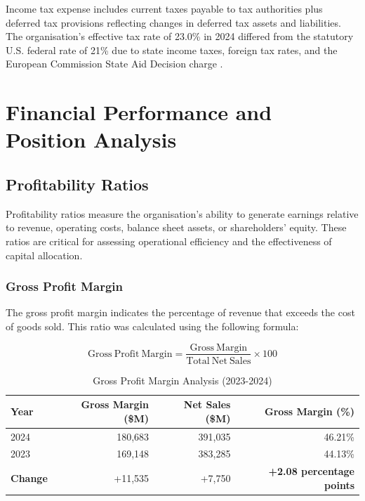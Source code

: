 \documentclass[12pt,a4paper]{article}
\begin{document}
Income tax expense includes current taxes payable to tax authorities plus deferred tax provisions reflecting changes in deferred tax assets and liabilities. The organisation's effective tax rate of 23.0\% in 2024 differed from the statutory U.S. federal rate of 21\% due to state income taxes, foreign tax rates, and the European Commission State Aid Decision charge \citep{apple202410k}.

\section{Financial Performance and Position Analysis}

\subsection{Profitability Ratios}

Profitability ratios measure the organisation's ability to generate earnings relative to revenue, operating costs, balance sheet assets, or shareholders' equity. These ratios are critical for assessing operational efficiency and the effectiveness of capital allocation.

\subsubsection{Gross Profit Margin}

The gross profit margin indicates the percentage of revenue that exceeds the cost of goods sold. This ratio was calculated using the following formula:

\begin{equation}
\mathrm{Gross\ Profit\ Margin} = \frac{\mathrm{Gross\ Margin}}{\mathrm{Total\ Net\ Sales}} \times 100
\end{equation}

\begin{table}[H]
\centering
\caption{Gross Profit Margin Analysis (2023-2024)}
\label{tab:gross_margin}
\begin{tabular}{lrrr}
\toprule
\textbf{Year} & \textbf{Gross Margin (\$M)} & \textbf{Net Sales (\$M)} & \textbf{Gross Margin (\%)} \\
\midrule
2024 & 180,683 & 391,035 & 46.21\% \\
2023 & 169,148 & 383,285 & 44.13\% \\
\textbf{Change} & +11,535 & +7,750 & \textbf{+2.08 percentage points} \\
\bottomrule
\end{tabular}
\end{table}
\end{document}
